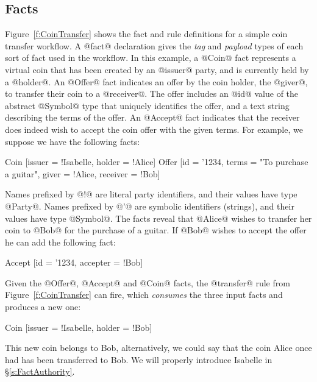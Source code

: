 \subsection{Facts}
\label{s:Facts}
Figure~\ref{f:CoinTransfer} shows the fact and rule definitions for a simple coin transfer workflow. A @fact@ declaration gives the \emph{tag} and \emph{payload} types of each sort of fact used in the workflow. In this example, a @Coin@ fact represents a virtual coin that has been created by an @issuer@ party, and is currently held by a @holder@. An @Offer@ fact indicates an offer by the coin holder, the @giver@, to transfer their coin to a @receiver@. The offer includes an @id@ value of the abstract @Symbol@ type that uniquely identifies the offer, and a text string describing the terms of the offer. An @Accept@ fact indicates that the receiver does indeed wish to accept the coin offer with the given terms. For example, we suppose we have the following facts:
\begin{small}
\begin{code}
 Coin   [issuer = !Isabelle, holder = !Alice]
 Offer  [id     = '1234,  terms    = "To purchase a guitar",
         giver  = !Alice, receiver = !Bob]
\end{code}
\end{small}

Names prefixed by @!@ are literal party identifiers, and their values have type @Party@. Names prefixed by @'@ are symbolic identifiers (strings), and their values have type @Symbol@. The facts reveal that @Alice@ wishes to transfer her coin to @Bob@ for the purchase of a guitar. If @Bob@ wishes to accept the offer he can add the following fact:
\begin{small}
\begin{code}
 Accept [id = '1234, accepter = !Bob]
\end{code}
\end{small}

Given the @Offer@, @Accept@ and @Coin@ facts, the @transfer@ rule from Figure~\ref{f:CoinTransfer} can fire, which \emph{consumes} the three input facts and produces a new one:
\begin{small}
\begin{code}
 Coin   [issuer = !Isabelle, holder = !Bob]
\end{code}
\end{small}

This new coin belongs to Bob, alternatively, we could say that the coin Alice once had has been transferred to Bob. We will properly introduce Isabelle in \S\ref{s:FactAuthority}.

